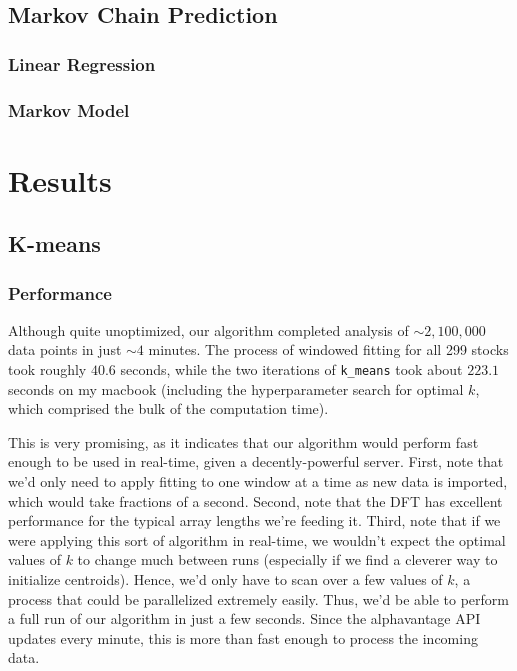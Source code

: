 \documentclass[final]{article}
\begin{document}
\subsection{Markov Chain Prediction}

\subsubsection{Linear Regression}

\subsubsection{Markov Model}

\section{Results}

\subsection{K-means}

\subsubsection{Performance}

Although quite unoptimized, our algorithm completed analysis of $\sim
2,100,000$ data points in just $\sim 4$ minutes. The process of
windowed fitting for all 299 stocks took roughly $40.6$ seconds, while
the two iterations of \texttt{k\_means} took about $223.1$ seconds on
my macbook (including the hyperparameter search for optimal $k$, which
comprised the bulk of the computation time).

This is very promising, as it indicates that our algorithm would
perform fast enough to be used in real-time, given a decently-powerful
server. First, note that we'd only need to apply fitting to one window
at a time as new data is imported, which would take fractions of a
second. Second, note that the DFT has excellent performance for the
typical array lengths we're feeding it. Third, note that if we were
applying this sort of algorithm in real-time, we wouldn't expect the
optimal values of $k$ to change much between runs (especially if we
find a cleverer way to initialize centroids). Hence, we'd only have to
scan over a few values of $k$, a process that could be parallelized
extremely easily. Thus, we'd be able to perform a full run of our
algorithm in just a few seconds. Since the alphavantage API updates
every minute, this is more than fast enough to process the incoming
data.
\end{document}
